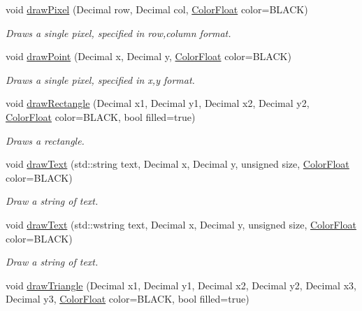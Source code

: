 \begin{DoxyCompactItemize}
void \hyperlink{classtsgl_1_1_cartesian_canvas_ad0bdf8651a9f703cfd6f71a6bd6ffe17}{draw\+Pixel} (Decimal row, Decimal col, \hyperlink{structtsgl_1_1_color_float}{Color\+Float} color=B\+L\+A\+C\+K)
\begin{DoxyCompactList}\small\item\em Draws a single pixel, specified in row,column format. \end{DoxyCompactList}\item 
void \hyperlink{classtsgl_1_1_cartesian_canvas_a2ef932501dd03f885fd0ff30ddffae01}{draw\+Point} (Decimal x, Decimal y, \hyperlink{structtsgl_1_1_color_float}{Color\+Float} color=B\+L\+A\+C\+K)
\begin{DoxyCompactList}\small\item\em Draws a single pixel, specified in x,y format. \end{DoxyCompactList}\item 
void \hyperlink{classtsgl_1_1_cartesian_canvas_a5e88e7d751e24ae78d158f1d8e9faf5e}{draw\+Rectangle} (Decimal x1, Decimal y1, Decimal x2, Decimal y2, \hyperlink{structtsgl_1_1_color_float}{Color\+Float} color=B\+L\+A\+C\+K, bool filled=true)
\begin{DoxyCompactList}\small\item\em Draws a rectangle. \end{DoxyCompactList}\item 
void \hyperlink{classtsgl_1_1_cartesian_canvas_a7df01e80ce99d0ce6b45532034c0940c}{draw\+Text} (std\+::string text, Decimal x, Decimal y, unsigned size, \hyperlink{structtsgl_1_1_color_float}{Color\+Float} color=B\+L\+A\+C\+K)
\begin{DoxyCompactList}\small\item\em Draw a string of text. \end{DoxyCompactList}\item 
void \hyperlink{classtsgl_1_1_cartesian_canvas_addacb4d3637bf2674e2a992a0c165160}{draw\+Text} (std\+::wstring text, Decimal x, Decimal y, unsigned size, \hyperlink{structtsgl_1_1_color_float}{Color\+Float} color=B\+L\+A\+C\+K)
\begin{DoxyCompactList}\small\item\em Draw a string of text. \end{DoxyCompactList}\item 
void \hyperlink{classtsgl_1_1_cartesian_canvas_a67c225592f9416de476943bb93309cd1}{draw\+Triangle} (Decimal x1, Decimal y1, Decimal x2, Decimal y2, Decimal x3, Decimal y3, \hyperlink{structtsgl_1_1_color_float}{Color\+Float} color=B\+L\+A\+C\+K, bool filled=true)

\end{DoxyCompactItemize}
